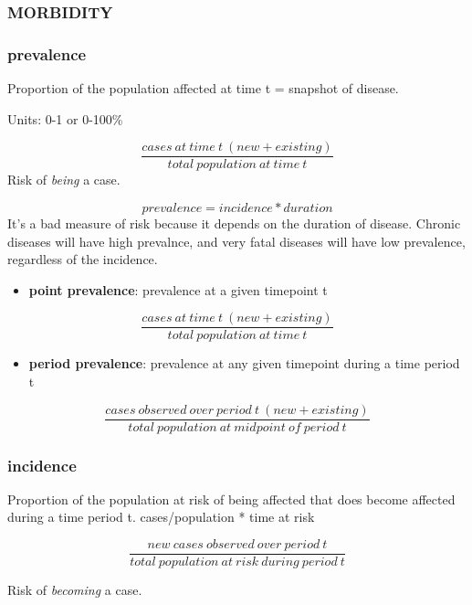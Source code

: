 \documentclass[
]{article}
\providecommand{\tightlist}{%
  \setlength{\itemsep}{0pt}\setlength{\parskip}{0pt}}
\begin{document}
\hypertarget{morbidity}{%
\subsubsection{MORBIDITY}\label{morbidity}}

\hypertarget{prevalence}{%
\subsubsection{prevalence}\label{prevalence}}

Proportion of the population affected at time t = snapshot of disease.

Units: 0-1 or 0-100\%

\[\frac{cases\:at\:time\:t\:(new + existing)}{total\:population\:at\:time\:t}\]
Risk of \emph{being} a case.

\[prevalence = incidence * duration\] It's a bad measure of risk because
it depends on the duration of disease. Chronic diseases will have high
prevalnce, and very fatal diseases will have low prevalence, regardless
of the incidence.

\begin{itemize}
\tightlist
\item
  \textbf{point prevalence}: prevalence at a given timepoint t
\end{itemize}

\[\frac{cases\:at\:time\:t\:(new + existing)}{total\:population\:at\:time\:t}\]

\begin{itemize}
\tightlist
\item
  \textbf{period prevalence}: prevalence at any given timepoint during a
  time period t
\end{itemize}

\[\frac{cases\:observed\:over\:period\:t\:(new + existing)}{total\:population\:at\:midpoint\:of\:period\:t}\]

\hypertarget{incidence}{%
\subsubsection{incidence}\label{incidence}}

Proportion of the population at risk of being affected that does become
affected during a time period t. cases/population * time at risk

\[\frac{new\:cases\:observed\:over\:period\:t}{total\:population\:at\:risk\:during\:period\:t}\]

Risk of \emph{becoming} a case.
\end{document}
